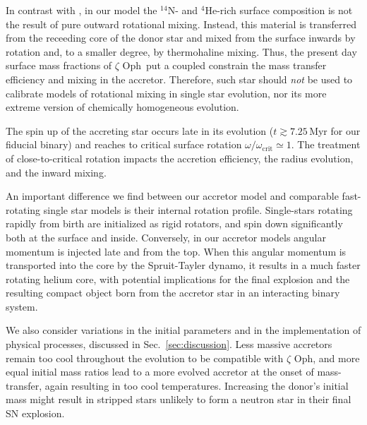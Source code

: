 \documentclass[twocolumn,twocolappendix,trackchanges]{aastex63}
\DeclareRobustCommand{\Secref}[1]{Sec.~\ref{#1}}
\newcommand{\zoph}{$\zeta$ Oph}
\begin{document}
In contrast with \cite{vanrensbergen:96}, in our model the
$^{14}\mathrm{N}$- and $^4\mathrm{He}$-rich surface composition is not
the result of pure outward rotational mixing.  Instead, this material
is transferred from the receeding core of the donor star and mixed
from the surface inwards by rotation and, to a smaller degree, by
thermohaline mixing.  Thus, the present day surface mass fractions of
\zoph\ put a coupled constrain the mass transfer efficiency and mixing
in the accretor. Therefore, such star should \emph{not} be used to
calibrate models of rotational mixing in single star evolution, nor
its more extreme version of chemically homogeneous evolution.

The spin up of the accreting star occurs late in its evolution
($t\gtrsim7.25$\,Myr for our fiducial binary) and
reaches to critical surface rotation
$\omega/\omega_\mathrm{crit}\simeq 1$. %
The treatment of close-to-critical rotation
impacts the accretion efficiency, the radius evolution, and the inward
mixing.

An important difference we find between our accretor model and
comparable fast-rotating single star models is their internal rotation
profile. Single-stars rotating rapidly from birth are initialized as
rigid rotators, and spin down significantly both at the surface and
inside. Conversely, in our accretor models angular momentum is
injected late and from the top. When this angular momentum is
transported into the core by the Spruit-Tayler dynamo, it results in a
much faster rotating helium core, with potential implications for the
final explosion and the resulting compact object born from the
accretor star in an interacting binary system. %


We also consider variations in the initial parameters and in the
implementation of physical processes, discussed in
\Secref{sec:discussion}.  Less massive accretors remain too cool
throughout the evolution to be compatible with \zoph, and more equal
initial mass ratios lead to a more evolved accretor at the onset of
mass-transfer, again resulting in too cool temperatures. Increasing
the donor's initial mass might result in stripped stars unlikely to
form a neutron star in their final SN explosion.
\end{document}
